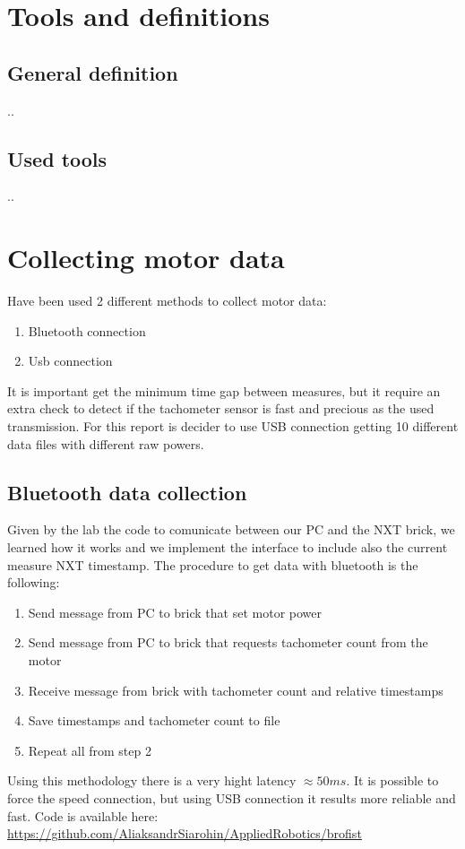 \documentclass[a4paper,12pt,oneside]{article}
\begin{document}
\section{Tools and definitions}
\subsection{General definition}
..
\subsection{Used tools}
..

\section{Collecting motor data}
Have been used 2 different methods to collect motor data:
\begin{enumerate}
\item Bluetooth connection
\item Usb connection
\end{enumerate}
It is important get the minimum time gap between measures, but it require an extra check to detect if the tachometer sensor is fast and precious as the used transmission.
For this report is decider to use USB connection getting 10 different data files with different raw powers.
\subsection{Bluetooth data collection}
Given by the lab the code to comunicate between our PC and the NXT brick, we learned how it works and we implement the interface to include also the current measure NXT timestamp. The procedure to get data with bluetooth is the following:
\begin{enumerate}
\item Send message from PC to brick that set motor power
\item Send message from PC to brick that requests tachometer count from the motor
\item Receive message from brick with tachometer count and relative timestamps
\item Save timestamps and tachometer count to file
\item Repeat all from step 2
\end{enumerate}
Using this methodology there is a very hight latency $\approx 50ms$. It is possible to force the speed connection, but using USB connection it results more reliable and fast.
Code is available here: \url{https://github.com/AliaksandrSiarohin/AppliedRobotics/brofist}
\end{document}
